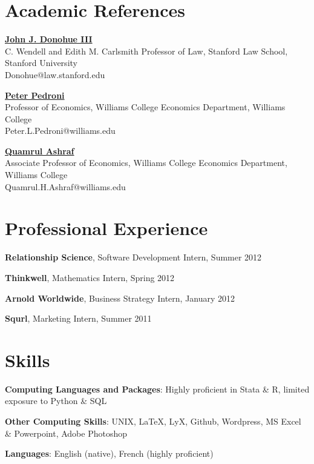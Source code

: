 \documentclass[margin,line]{res}
\begin{document}
\begin{resume}
\section{\sc Academic References}

\href{https://law.stanford.edu/directory/john-j-donohue-iii/}{\bf John J. Donohue III}\\
C. Wendell and Edith M. Carlsmith Professor of Law, Stanford Law School, Stanford University \\
{\ttfamily Donohue@law.stanford.edu}

\vspace{-.3cm}
\href{http://econ.williams.edu/people/ppedroni}{\bf Peter Pedroni}\\
Professor of Economics, Williams College Economics Department, Williams College \\
{\ttfamily Peter.L.Pedroni@williams.edu}

\vspace{-.3cm}
\href{http://econ.williams.edu/people/qha1}{\bf Quamrul Ashraf}\\
Associate Professor of Economics, Williams College Economics Department, Williams College  \\
{\ttfamily Quamrul.H.Ashraf@williams.edu}

\section{\sc Professional Experience}

{\bf Relationship Science}, Software Development Intern, Summer 2012

\vspace*{-3mm}
{\bf Thinkwell},  Mathematics Intern, Spring 2012

\vspace*{-3mm}
{\bf Arnold Worldwide},  Business Strategy Intern, January 2012

\vspace*{-3mm}
{\bf Squrl},  Marketing Intern, Summer 2011 

\section{\sc Skills} 
{\bf Computing Languages and Packages}:  Highly proficient in Stata \& R, limited exposure to Python \& SQL
\vspace*{-3mm}

{\bf Other Computing Skills}: UNIX, \LaTeX, LyX, Github, Wordpress, MS Excel \& Powerpoint, Adobe Photoshop
\vspace*{-3mm}

{\bf Languages}: English (native), French (highly proficient)

\end{resume}
\end{document}
